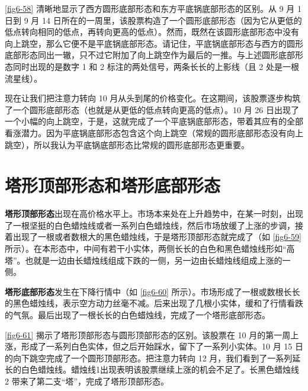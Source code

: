\autoref{fig6-58} 清晰地显示了西方圆形底部形态和东方平底锅底部形态的区别。从 9 月 1 日到 9 月 14 日所在的一周里，该股票构造了一个圆形底部形态（因为它从更低的低点转向相同的低点，再转向更高的低点）。然而，既然在该圆形底部形态中没有向上跳空，那么它便不是平底锅底部形态。请记住，平底锅底部形态与西方的圆形底部形态同出一辙，只不过它附加了向上跳空作为最后的一推。与上述圆形底部形态同时出现的是数字 1 和 2 标注的两处信号，两条长长的上影线（且 2 处是一根流星线）。

现在让我们把注意力转向 10 月从头到尾的价格变化。在这期间，该股票逐步构筑了一个圆形底部形态（也就是从更低的低点转向更高的低点）。10 月 26 日出现了一个小幅的向上跳空，于是，这就完成了一个平底锅底部形态，带着其应有的全部看涨潜力。因为平底锅底部形态包含这个向上跳空（常规的圆形底部形态没有向上跳空），所以我认为平底锅底部形态比常规的圆形底部形态更重要。

\section{塔形顶部形态和塔形底部形态}
\textbf{塔形顶部形态}出现在高价格水平上。市场本来处在上升趋势中，在某一时刻，出现了一根坚挺的白色蜡烛线或者一系列白色蜡烛线，然后市场放缓了上涨的步调，接着出现了一根或者数根大的黑色蜡烛线，于是塔形顶部形态就完成了（如 \autoref{fig6-59} 所示）。在本形态中，中间有若干小实体，两侧长长的白色和黑色蜡烛线形如“高塔”。也就是一边由长蜡烛线组成下跌的一侧，另一边由长蜡烛线组成上涨的一侧。


\textbf{塔形底部形态}发生在下降行情中（如 \autoref{fig6-60} 所示）。市场形成了一根或数根长长的黑色蜡烛线，表示空方动力丝毫不减。后来出现了几根小实体，缓和了行情看跌的气氛。最后出现了一根长长的白色蜡烛线，完成了一个塔形底部形态。


\autoref{fig6-61} 揭示了塔形顶部形态与圆形顶部形态的区别。该股票在 10 月的第一周上涨，形成了一系列白色实体，但之后开始踩水，留下了一系列小实体。10 月 15 日的向下跳空完成了一个圆形顶部形态。把注意力转向 12 月，我们看到了一系列延长的白色蜡烛线。蜡烛线1出现表明该股票继续上涨的机会不足了。长黑色蜡烛线 2 带来了第二支“塔”，完成了塔形顶部形态。

